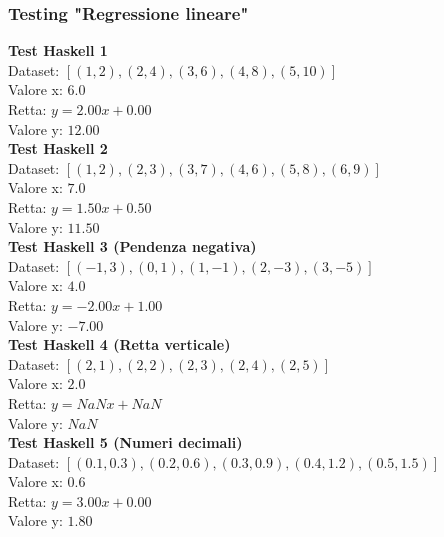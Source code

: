 \documentclass[11pt]{article}
\theoremstyle{definition}
\begin{document}
\subsubsection{Testing "Regressione lineare"}
\noindent
\textbf{Test Haskell 1}\\
Dataset: $[(1, 2), (2, 4), (3, 6), (4, 8), (5, 10)]$\\
Valore x: $6.0$\\
Retta: $y = 2.00x + 0.00$\\
Valore y: $12.00$\\
\newline
\textbf{Test Haskell 2}\\
Dataset: $[(1, 2), (2, 3), (3, 7), (4, 6), (5, 8), (6, 9)]$\\
Valore x: $7.0$\\
Retta: $y = 1.50x + 0.50$\\
Valore y: $11.50$\\
\newline
\textbf{Test Haskell 3 (Pendenza negativa)}\\
Dataset: $[(-1, 3), (0, 1), (1, -1), (2, -3), (3, -5)]$\\
Valore x: $4.0$\\
Retta: $y = -2.00x + 1.00$\\
Valore y: $-7.00$\\
\newline
\textbf{Test Haskell 4 (Retta verticale)}\\
Dataset: $[(2, 1), (2, 2), (2, 3), (2, 4), (2, 5)]$\\
Valore x: $2.0$\\
Retta: $y = NaNx + NaN$\\
Valore y: $NaN$\\
\newline
\textbf{Test Haskell 5 (Numeri decimali)}\\
Dataset: $[(0.1, 0.3), (0.2, 0.6), (0.3, 0.9), (0.4, 1.2), (0.5, 1.5)]$\\
Valore x: $0.6$\\
Retta: $y = 3.00x + 0.00$\\
Valore y: $1.80$
\end{document}
